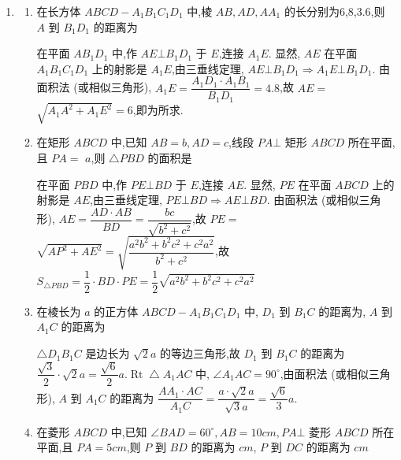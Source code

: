 \begin{enumerate}
    \item \begin{enumerate}
        \item 在长方体 ${ABCD} - {A}_{1}{B}_{1}{C}_{1}{D}_{1}$ 中,棱 ${AB},{AD},A{A}_{1}$ 的长分别为6,8,3.6,则 $A$ 到 ${B}_{1}{D}_{1}$ 的距离为
        \begin{jieda}
            在平面 $A{B}_{1}{D}_{1}$ 中,作 ${AE}\bot {B}_{1}{D}_{1}$ 于 $E$,连接 ${A}_{1}E$. 显然, ${AE}$ 在平面 ${A}_{1}{B}_{1}{C}_{1}{D}_{1}$ 上的射影是 ${A}_{1}E$,由三垂线定理, ${AE} \bot  {B}_{1}{D}_{1} \Longrightarrow  {A}_{1}E \bot  {B}_{1}{D}_{1}$. 由面积法 (或相似三角形), ${A}_{1}E = \dfrac{{A}_{1}{D}_{1} \cdot  {A}_{1}{B}_{1}}{{B}_{1}{D}_{1}} = {4.8}$,故 ${AE} =$  $\sqrt{{A}_{1}{A}^{2} + {A}_{1}{E}^{2}} = 6$,即为所求.
        \end{jieda}
        \item 在矩形 ${ABCD}$ 中,已知 ${AB} = b,{AD} = c$,线段 ${PA}\bot$ 矩形 ${ABCD}$ 所在平面,且 ${PA} =$  $a$,则 $\bigtriangleup  {PBD}$ 的面积是
        \begin{jieda}
            在平面 ${PBD}$ 中,作 ${PE}\bot {BD}$ 于 $E$,连接 ${AE}$. 显然, ${PE}$ 在平面 ${ABCD}$ 上的射影是 ${AE}$,由三垂线定理, ${PE} \bot  {BD} \Longrightarrow  {AE} \bot  {BD}$. 由面积法 (或相似三角形), ${AE} = \dfrac{{AD} \cdot  {AB}}{BD} = \dfrac{bc}{\sqrt{{b}^{2} + {c}^{2}}}$,故 ${PE} =$  $\sqrt{A{P}^{2} + A{E}^{2}} = \sqrt{\dfrac{{a}^{2}{b}^{2} + {b}^{2}{c}^{2} + {c}^{2}{a}^{2}}{{b}^{2} + {c}^{2}}}$,故 ${S}_{\bigtriangleup {PBD}} = \dfrac{1}{2} \cdot  {BD} \cdot  {PE} = \dfrac{1}{2}\sqrt{{a}^{2}{b}^{2} + {b}^{2}{c}^{2} + {c}^{2}{a}^{2}}$
        \end{jieda}
        \item 在棱长为 $a$ 的正方体 ${ABCD} - {A}_{1}{B}_{1}{C}_{1}{D}_{1}$ 中, ${D}_{1}$ 到 ${B}_{1}C$ 的距离为, $A$ 到 ${A}_{1}C$ 的距离为
        \begin{jieda}
            $\bigtriangleup {D}_{1}{B}_{1}C$ 是边长为 $\sqrt{2}a$ 的等边三角形,故 ${D}_{1}$ 到 ${B}_{1}C$ 的距离为 $\dfrac{\sqrt{3}}{2} \cdot  \sqrt{2}a = \dfrac{\sqrt{6}}{2}a.\operatorname{Rt} \bigtriangleup  {A}_{1}{AC}$ 中, $\angle {A}_{1}{AC} = {90}^{ \circ  }$,由面积法 (或相似三角形), $A$ 到 ${A}_{1}C$ 的距离为 $\dfrac{A{A}_{1} \cdot  {AC}}{{A}_{1}C} = \dfrac{a \cdot  \sqrt{2}a}{\sqrt{3}a} = \dfrac{\sqrt{6}}{3}a.$
        \end{jieda}
        \item 在菱形 ${ABCD}$ 中,已知 $\angle {BAD} = {60}^{ \circ  },{AB} = {10}{{cm}},{PA}\bot$ 菱形 ${ABCD}$ 所在平面,且 ${PA} = {5{{cm}}}$,则 $P$ 到 ${BD}$ 的距离为 ${{cm}}$, $P$ 到 ${DC}$ 的距离为 ${{cm}}$

\end{enumerate}
\end{enumerate}
